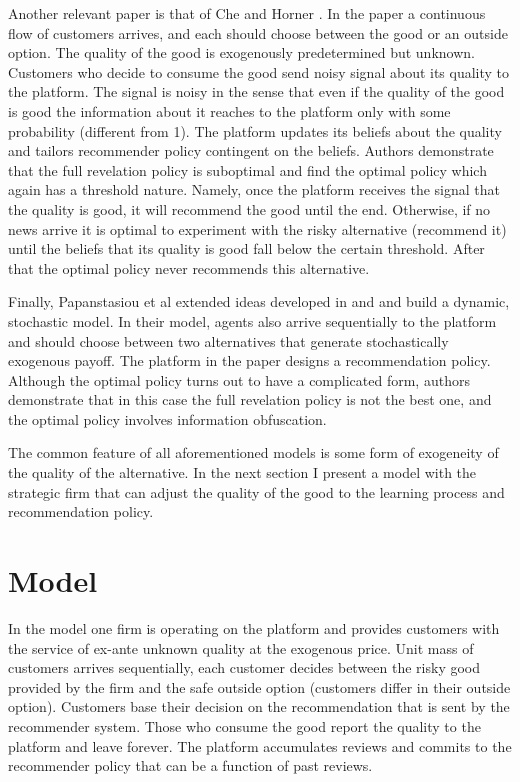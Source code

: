 \documentclass[a4paper]{article}
\begin{document}
	
	
	
	Another relevant paper is that of Che and Horner \cite{che2015}. In the paper a continuous flow of customers arrives, and each should choose between the good or an outside option. The quality of the good is exogenously predetermined but unknown. Customers who decide to consume the good send noisy signal about its quality to the platform. The signal is noisy in the sense that even if the quality of the good is good the information about it reaches to the platform only with some probability (different from 1). The platform updates its beliefs about the quality and tailors recommender policy contingent on the beliefs. Authors demonstrate that the full revelation policy is suboptimal and find the optimal policy which again has a threshold nature. Namely, once the platform receives the signal that the quality is good, it will recommend the good until the end. Otherwise, if no news arrive it is optimal to experiment with the risky alternative (recommend it) until the beliefs that its quality is good fall below the certain threshold. After that the optimal policy never recommends this alternative.
	
	
	
	Finally, Papanstasiou et al \cite{papanastasiou2017} extended ideas developed in \cite{kremer2014} and \cite{che2015} and build a dynamic, stochastic model. In their model, agents also arrive sequentially to the platform and should choose between two alternatives that generate stochastically exogenous payoff. The platform in the paper designs a recommendation policy. Although the optimal policy turns out to have a complicated form, authors demonstrate that in this case the full revelation policy is not the best one, and the optimal policy involves information obfuscation.
	
	
	
	
	The common feature of all aforementioned models is some form of exogeneity of the quality of the alternative. In the next section I present a model with the strategic firm that can adjust the quality of the good to the learning process and recommendation policy.
	
	\section{Model}
	In the model one firm is operating on the platform and provides customers with the service of ex-ante unknown quality at the exogenous price. Unit mass of customers arrives sequentially, each customer decides between the risky good provided by the firm and the safe outside option (customers differ in their outside option). Customers base their decision on the recommendation that is sent by the recommender system. Those who consume the good report the quality to the platform and leave forever. The platform accumulates reviews and commits to the recommender policy that can be a function of past reviews.
	
\end{document}

